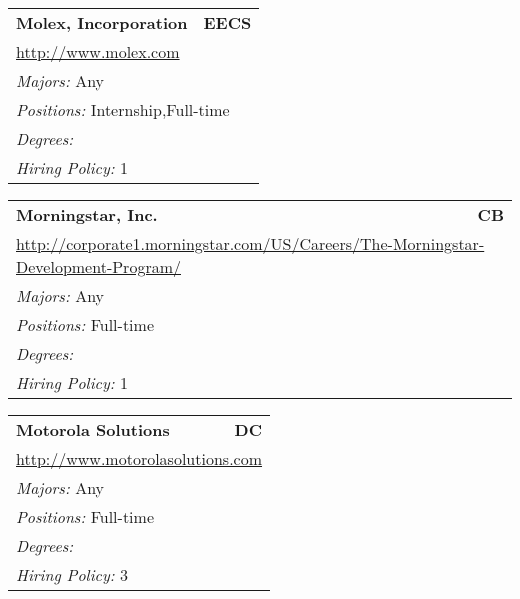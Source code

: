 \documentclass[twoside]{article}
\begin{document}
\begin{center}
\begin{multicols}{3}
\begin{FlushLeft}
\begin{minipage}{\columnwidth}
\end{minipage}
 
\begin{minipage}{\columnwidth}\begin{tabularx}{.95\columnwidth}{Xr}
                 {\Large\bf Molex, Incorporation} & {\Large\bf EECS}\\
    \multicolumn{2}{p{.95\columnwidth}}{\url{http://www.molex.com}}\\
    \multicolumn{2}{p{.95\columnwidth}}{\emph{Majors:} Any}\\
    \multicolumn{2}{p{.95\columnwidth}}{\emph{Positions:} Internship,Full-time}\\
    \multicolumn{2}{p{.95\columnwidth}}{\emph{Degrees:} }\\
    \multicolumn{2}{p{.95\columnwidth}}{\emph{Hiring Policy:} 1}\\
    \end{tabularx}
    
\end{minipage}
 
\begin{minipage}{\columnwidth}\begin{tabularx}{.95\columnwidth}{Xr}
                 {\Large\bf Morningstar, Inc.} & {\Large\bf CB}\\
    \multicolumn{2}{p{.95\columnwidth}}{\url{http://corporate1.morningstar.com/US/Careers/The-Morningstar-Development-Program/}}\\
    \multicolumn{2}{p{.95\columnwidth}}{\emph{Majors:} Any}\\
    \multicolumn{2}{p{.95\columnwidth}}{\emph{Positions:} Full-time}\\
    \multicolumn{2}{p{.95\columnwidth}}{\emph{Degrees:} }\\
    \multicolumn{2}{p{.95\columnwidth}}{\emph{Hiring Policy:} 1}\\
    \end{tabularx}
    
\end{minipage}
 
\begin{minipage}{\columnwidth}\begin{tabularx}{.95\columnwidth}{Xr}
                 {\Large\bf Motorola Solutions} & {\Large\bf DC}\\
    \multicolumn{2}{p{.95\columnwidth}}{\url{http://www.motorolasolutions.com}}\\
    \multicolumn{2}{p{.95\columnwidth}}{\emph{Majors:} Any}\\
    \multicolumn{2}{p{.95\columnwidth}}{\emph{Positions:} Full-time}\\
    \multicolumn{2}{p{.95\columnwidth}}{\emph{Degrees:} }\\
    \multicolumn{2}{p{.95\columnwidth}}{\emph{Hiring Policy:} 3}\\
    \end{tabularx}
    

\end{minipage}
\end{FlushLeft}
\end{multicols}
\end{center}
\end{document}
